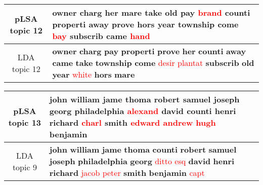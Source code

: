 \begin{center}\begin{tabularx}{\textwidth} {
  | c | >{\raggedright\arraybackslash}X | } \hline 
pLSA topic 12 & \textbf{owner} \textbf{charg} \textbf{her} \textbf{mare} \textbf{take} \textbf{old} \textbf{pay} \textcolor{red}{brand} \textbf{counti} \textbf{properti} \textbf{away} \textbf{prove} \textbf{hors} \textbf{year} \textbf{township} \textbf{come} \textcolor{red}{bay} \textbf{subscrib} \textbf{came} \textcolor{red}{hand} \\ \hline 
LDA topic 12 & \textbf{owner} \textbf{charg} \textbf{pay} \textbf{properti} \textbf{prove} \textbf{her} \textbf{counti} \textbf{away} \textbf{came} \textbf{take} \textbf{township} \textbf{come} \textcolor{red}{desir} \textcolor{red}{plantat} \textbf{subscrib} \textbf{old} \textbf{year} \textcolor{red}{white} \textbf{hors} \textbf{mare} \\ \hline 
\end{tabularx}

\end{center}

\begin{center}\begin{tabularx}{\textwidth} {
  | c | >{\raggedright\arraybackslash}X | } \hline 
pLSA topic 13 & \textbf{john} \textbf{william} \textbf{jame} \textbf{thoma} \textbf{robert} \textbf{samuel} \textbf{joseph} \textbf{georg} \textbf{philadelphia} \textcolor{red}{alexand} \textbf{david} \textbf{counti} \textbf{henri} \textbf{richard} \textcolor{red}{charl} \textbf{smith} \textcolor{red}{edward} \textcolor{red}{andrew} \textcolor{red}{hugh} \textbf{benjamin} \\ \hline 
LDA topic 9 & \textbf{john} \textbf{william} \textbf{jame} \textbf{thoma} \textbf{counti} \textbf{robert} \textbf{samuel} \textbf{joseph} \textbf{philadelphia} \textbf{georg} \textcolor{red}{ditto} \textcolor{red}{esq} \textbf{david} \textbf{henri} \textbf{richard} \textcolor{red}{jacob} \textcolor{red}{peter} \textbf{smith} \textbf{benjamin} \textcolor{red}{capt} \\ \hline 
\end{tabularx}

\end{center}

